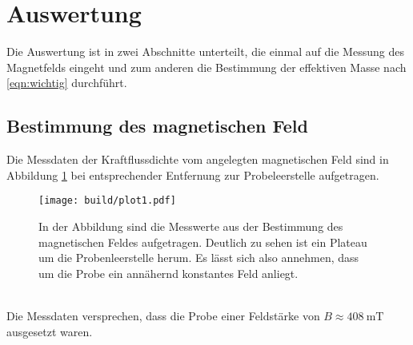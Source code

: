 \newpage
\section{Auswertung}
Die Auswertung ist in zwei Abschnitte unterteilt, die einmal auf die Messung des Magnetfelds eingeht und zum 
anderen die Bestimmung der effektiven Masse nach \eqref{eqn:wichtig} durchführt. 
\subsection{Bestimmung des magnetischen Feld}
Die Messdaten der Kraftflussdichte vom angelegten magnetischen Feld sind in Abbildung \ref{fig:mag}
bei entsprechender Entfernung zur Probeleerstelle aufgetragen.
\begin{figure}
    \centering
    \texttt{[image: build/plot1.pdf]}
    \caption{In der Abbildung sind die Messwerte aus der Bestimmung des magnetischen Feldes aufgetragen. 
            Deutlich zu sehen ist ein Plateau um die Probenleerstelle herum. Es lässt sich also annehmen, dass
            um die Probe ein annähernd konstantes Feld anliegt.}
    \label{fig:mag}
\end{figure}
\\
Die Messdaten versprechen, dass die Probe einer Feldstärke von 
    $B \approx \SI{408}{\milli\tesla}$
ausgesetzt waren.

